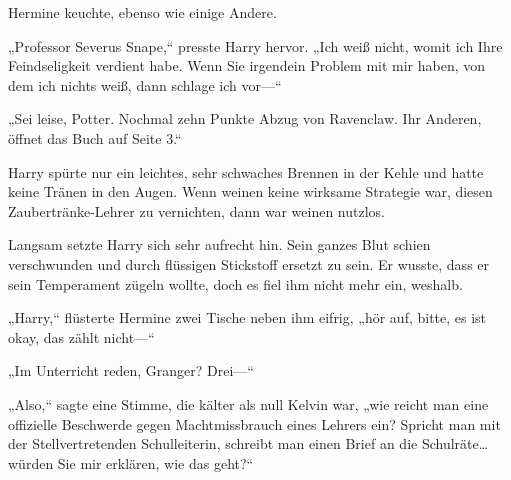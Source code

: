 Hermine keuchte, ebenso wie einige Andere.

„Professor Severus Snape,“ presste Harry hervor. „Ich weiß nicht, womit ich Ihre Feindseligkeit verdient habe. Wenn Sie irgendein Problem mit mir haben, von dem ich nichts weiß, dann schlage ich vor—“

„Sei leise, Potter. Nochmal zehn Punkte Abzug von Ravenclaw. Ihr Anderen, öffnet das Buch auf Seite 3.“

Harry spürte nur ein leichtes, sehr schwaches Brennen in der Kehle und hatte keine Tränen in den Augen. Wenn weinen keine wirksame Strategie war, diesen Zaubertränke-Lehrer zu vernichten, dann war weinen nutzlos.

Langsam setzte Harry sich sehr aufrecht hin. Sein ganzes Blut schien verschwunden und durch flüssigen Stickstoff ersetzt zu sein. Er wusste, dass er sein Temperament zügeln wollte, doch es fiel ihm nicht mehr ein, weshalb.

„Harry,“ flüsterte Hermine zwei Tische neben ihm eifrig, „hör auf, bitte, es ist okay, das zählt nicht—“

„Im Unterricht reden, Granger? Drei—“

„Also,“ sagte eine Stimme, die kälter als null Kelvin war, „wie reicht man eine offizielle Beschwerde gegen Machtmissbrauch eines Lehrers ein? Spricht man mit der Stellvertretenden Schulleiterin, schreibt man einen Brief an die Schulräte…würden Sie mir erklären, wie das geht?“

